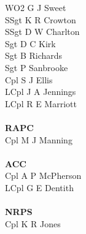 \begin{multicols}{4}
  WO2 G J Sweet \\
  SSgt K R Crowton \\
  SSgt D W Charlton \\
  Sgt D C Kirk \\
  Sgt B Richards \\
  Sgt P Sanbrooke \\
  Cpl S J Ellis \\
  LCpl J A Jennings \\
  LCpl R E Marriott \\
  \\
  \textbf{RAPC} \\
  Cpl M J Manning \\
  \\
  \textbf{ACC} \\
  Cpl A P McPherson \\
  LCpl G E Dentith \\
  \\
  \textbf{NRPS} \\
  Cpl K R Jones
\end{multicols}

\pagebreak
